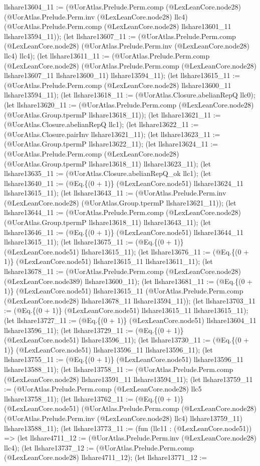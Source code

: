 \documentclass[11pt]{article}
\begin{document}
llshare13604\_11 := (@UorAtlas.Prelude.Perm.comp (@LexLeanCore.node28) (@UorAtlas.Prelude.Perm.inv (@LexLeanCore.node28) llc4) (@UorAtlas.Prelude.Perm.comp (@LexLeanCore.node28) llshare13601\_11 llshare13594\_11)); (let llshare13607\_11 := (@UorAtlas.Prelude.Perm.comp (@LexLeanCore.node28) (@UorAtlas.Prelude.Perm.inv (@LexLeanCore.node28) llc4) llc4); (let llshare13611\_11 := (@UorAtlas.Prelude.Perm.comp (@LexLeanCore.node28) (@UorAtlas.Prelude.Perm.comp (@LexLeanCore.node28) llshare13607\_11 llshare13600\_11) llshare13594\_11); (let llshare13615\_11 := (@UorAtlas.Prelude.Perm.comp (@LexLeanCore.node28) llshare13600\_11 llshare13594\_11); (let llshare13618\_11 := (@UorAtlas.Closure.abelianRepQ llc0); (let llshare13620\_11 := (@UorAtlas.Prelude.Perm.comp (@LexLeanCore.node28) (@UorAtlas.Group.tpermP llshare13618\_11)); (let llshare13621\_11 := (@UorAtlas.Closure.abelianRepQ llc1); (let llshare13622\_11 := (@UorAtlas.Closure.pairInv llshare13621\_11); (let llshare13623\_11 := (@UorAtlas.Group.tpermP llshare13622\_11); (let llshare13624\_11 := (@UorAtlas.Prelude.Perm.comp (@LexLeanCore.node28) (@UorAtlas.Group.tpermP llshare13618\_11) llshare13623\_11); (let llshare13635\_11 := (@UorAtlas.Closure.abelianRepQ\_ok llc1); (let llshare13640\_11 := (@Eq.\{(0 + 1)\} (@LexLeanCore.node51) llshare13624\_11 llshare13615\_11); (let llshare13643\_11 := (@UorAtlas.Prelude.Perm.inv (@LexLeanCore.node28) (@UorAtlas.Group.tpermP llshare13621\_11)); (let llshare13644\_11 := (@UorAtlas.Prelude.Perm.comp (@LexLeanCore.node28) (@UorAtlas.Group.tpermP llshare13618\_11) llshare13643\_11); (let llshare13646\_11 := (@Eq.\{(0 + 1)\} (@LexLeanCore.node51) llshare13644\_11 llshare13615\_11); (let llshare13675\_11 := (@Eq.\{(0 + 1)\} (@LexLeanCore.node51) llshare13615\_11); (let llshare13676\_11 := (@Eq.\{(0 + 1)\} (@LexLeanCore.node51) llshare13615\_11 llshare13611\_11); (let llshare13678\_11 := (@UorAtlas.Prelude.Perm.comp (@LexLeanCore.node28) (@LexLeanCore.node389) llshare13600\_11); (let llshare13681\_11 := (@Eq.\{(0 + 1)\} (@LexLeanCore.node51) llshare13615\_11 (@UorAtlas.Prelude.Perm.comp (@LexLeanCore.node28) llshare13678\_11 llshare13594\_11)); (let llshare13703\_11 := (@Eq.\{(0 + 1)\} (@LexLeanCore.node51) llshare13615\_11 llshare13615\_11); (let llshare13727\_11 := (@Eq.\{(0 + 1)\} (@LexLeanCore.node51) llshare13604\_11 llshare13596\_11); (let llshare13729\_11 := (@Eq.\{(0 + 1)\} (@LexLeanCore.node51) llshare13596\_11); (let llshare13730\_11 := (@Eq.\{(0 + 1)\} (@LexLeanCore.node51) llshare13596\_11 llshare13596\_11); (let llshare13755\_11 := (@Eq.\{(0 + 1)\} (@LexLeanCore.node51) llshare13596\_11 llshare13588\_11); (let llshare13758\_11 := (@UorAtlas.Prelude.Perm.comp (@LexLeanCore.node28) llshare13591\_11 llshare13594\_11); (let llshare13759\_11 := (@UorAtlas.Prelude.Perm.comp (@LexLeanCore.node28) llc5 llshare13758\_11); (let llshare13762\_11 := (@Eq.\{(0 + 1)\} (@LexLeanCore.node51) (@UorAtlas.Prelude.Perm.comp (@LexLeanCore.node28) (@UorAtlas.Prelude.Perm.inv (@LexLeanCore.node28) llc4) llshare13759\_11) llshare13588\_11); (let llshare13773\_11 := (fun (llc11 : (@LexLeanCore.node51)) => (let llshare4711\_12 := (@UorAtlas.Prelude.Perm.inv (@LexLeanCore.node28) llc4); (let llshare13737\_12 := (@UorAtlas.Prelude.Perm.comp (@LexLeanCore.node28) llshare4711\_12); (let llshare13771\_12 := 
\end{document}
